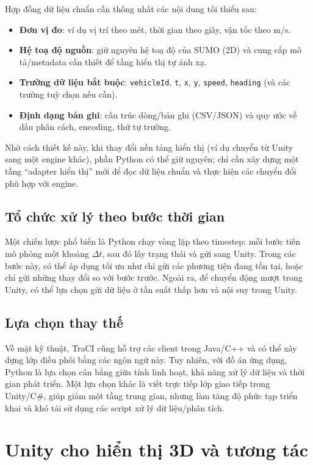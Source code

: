 \documentclass[../DoAn.tex]{subfiles}
\begin{document}
Hợp đồng dữ liệu chuẩn cần thống nhất các nội dung tối thiểu sau:
\begin{itemize}[leftmargin=2em]
	\item \textbf{Đơn vị đo}: ví dụ vị trí theo mét, thời gian theo giây, vận tốc theo m/s.
	\item \textbf{Hệ toạ độ nguồn}: giữ nguyên hệ toạ độ của SUMO (2D) và cung cấp mô tả/metadata cần thiết để tầng hiển thị tự ánh xạ.
	\item \textbf{Trường dữ liệu bắt buộc}: \texttt{vehicleId}, \texttt{t}, \texttt{x}, \texttt{y}, \texttt{speed}, \texttt{heading} (và các trường tuỳ chọn nếu cần).
	\item \textbf{Định dạng bản ghi}: cấu trúc dòng/bản ghi (CSV/JSON) và quy ước về dấu phân cách, encoding, thứ tự trường.
\end{itemize}

Nhờ cách thiết kế này, khi thay đổi nền tảng hiển thị (ví dụ chuyển từ Unity sang một engine khác), phần Python có thể giữ nguyên; chỉ cần xây dựng một tầng ``adapter hiển thị'' mới để đọc dữ liệu chuẩn và thực hiện các chuyển đổi phù hợp với engine.

\subsection{Tổ chức xử lý theo bước thời gian}
Một chiến lược phổ biến là Python chạy vòng lặp theo timestep: mỗi bước tiến mô phỏng một khoảng $\Delta t$, sau đó lấy trạng thái và gửi sang Unity. Trong các bước này, có thể áp dụng tối ưu như chỉ gửi các phương tiện đang tồn tại, hoặc chỉ gửi những thay đổi so với bước trước. Ngoài ra, để chuyển động mượt trong Unity, có thể lựa chọn gửi dữ liệu ở tần suất thấp hơn và nội suy trong Unity.

\subsection{Lựa chọn thay thế}
Về mặt kỹ thuật, TraCI cũng hỗ trợ các client trong Java/C++ và có thể xây dựng lớp điều phối bằng các ngôn ngữ này. Tuy nhiên, với đồ án ứng dụng, Python là lựa chọn cân bằng giữa tính linh hoạt, khả năng xử lý dữ liệu và thời gian phát triển. Một lựa chọn khác là viết trực tiếp lớp giao tiếp trong Unity/C\#, giúp giảm một tầng trung gian, nhưng làm tăng độ phức tạp triển khai và khó tái sử dụng các script xử lý dữ liệu/phân tích.

\section{Unity cho hiển thị 3D và tương tác}
\end{document}
